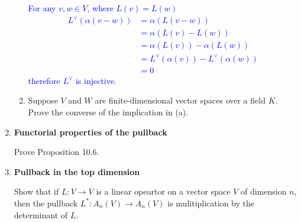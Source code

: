 \documentclass[12pt,a4paper]{report}
\newcommand{\BLUE}[1]{\textcolor{blue}{#1}}
\begin{document}
\begin{enumerate}[label=10.\arabic*.]
\begin{enumerate}[label=(\alph*)]
	\BLUE{For any $v,w \in V$, where $L(v) = L(w)$
	\begin{align*}
		L^\vee(\alpha(v-w))&=\alpha(L(v-w)) \\
		&= \alpha(L(v) - L(w))\\
		&= \alpha(L(v))-\alpha(L(w))\\
		&= L^\vee(\alpha(v))-L^\vee(\alpha(w)) \\
		&= 0
	\end{align*}therefore $L^\vee$ is injective.
	}
	
	\item Suppose $V$ and $W$ are finite-dimensional vector spaces over a field $K$.  Prove the converse of the implication in (a).
\end{enumerate}

\item \textbf{Functorial properties of the pullback}

Prove Proposition 10.6.

\item \textbf{Pullback in the top dimension}

Show that if $L: V \to V$ is a linear opeartor on a vector space $V$ of dimension $n$, then the pullback $L^*:A_n(V) \to A_n(V)$ is mulitiplication by the determinant of $L$.

\end{enumerate}
\end{document}
